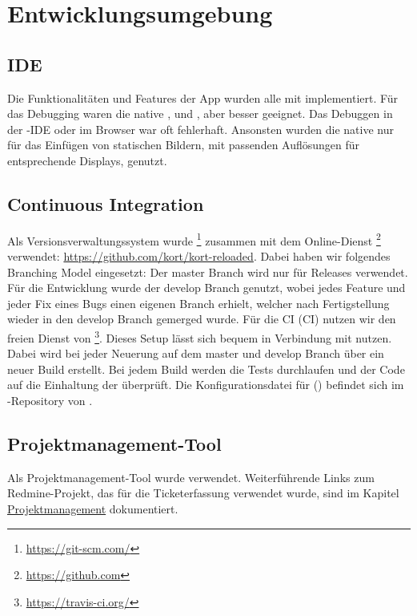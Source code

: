 \chapter{Entwicklungsumgebung}
\label{pd-entwicklungsumgebung}
\section{IDE}
Die Funktionalitäten und Features der App wurden alle mit  implementiert. 
Für das Debugging waren die native ,  und , aber besser geeignet. 
Das Debuggen in der -\gls{IDE} oder im  Browser war oft fehlerhaft. 
Ansonsten wurden die native  nur für das Einfügen von statischen Bildern, mit passenden Auflösungen für entsprechende Displays, genutzt. 


\section{Continuous Integration}
Als Versionsverwaltungssystem wurde \footnote{\url{https://git-scm.com/}} zusammen mit dem Online-Dienst \footnote{\url{https://github.com}} verwendet: \url{https://github.com/kort/kort-reloaded}.
Dabei haben wir folgendes Branching Model eingesetzt: Der master Branch wird nur für Releases verwendet.
Für die Entwicklung wurde der develop Branch genutzt, wobei jedes Feature und jeder Fix eines Bugs einen eigenen Branch erhielt, welcher nach Fertigstellung wieder in den develop Branch gemerged wurde.\newline
\newline
Für die \gls{CI} (CI) nutzen wir den freien Dienst von \footnote{\url{https://travis-ci.org/}}.
Dieses Setup lässt sich bequem in Verbindung mit  nutzen. 
Dabei wird bei jeder Neuerung auf dem master und develop Branch über  ein neuer Build erstellt.
Bei jedem Build werden die Tests durchlaufen und der Code auf die Einhaltung der  überprüft.\newline
Die Konfigurationsdatei für  () befindet sich im -Repository von \kort{}.

\section{Projektmanagement-Tool}
Als Projektmanagement-Tool wurde  verwendet. 
Weiterführende Links zum Redmine-Projekt, das für die Ticketerfassung verwendet wurde, sind im Kapitel \hyperref[pm-projektmanagement]{Projektmanagement} dokumentiert.


